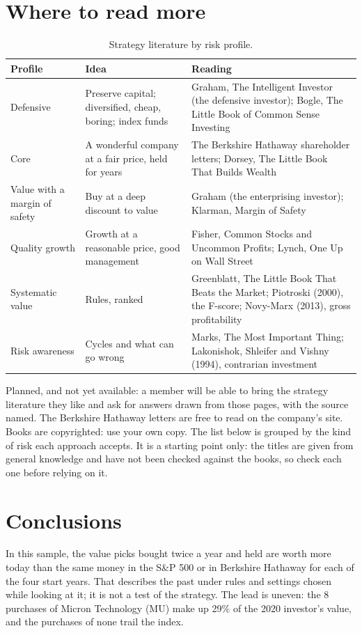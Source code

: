 \documentclass[11pt,a4paper]{article}
\begin{document}
\section{Where to read more}
\label{sec:reading}
\begin{table}[H]
\centering
\small
\caption{Strategy literature by risk profile.}\label{tab:reading}
\begin{tabular}{l p{4.5cm} p{5.6cm}}
\hline
Profile & Idea & Reading \\
\hline
Defensive & Preserve capital; diversified, cheap, boring; index funds & Graham, The Intelligent Investor (the defensive investor); Bogle, The Little Book of Common Sense Investing \\
Core & A wonderful company at a fair price, held for years & The Berkshire Hathaway shareholder letters; Dorsey, The Little Book That Builds Wealth \\
Value with a margin of safety & Buy at a deep discount to value & Graham (the enterprising investor); Klarman, Margin of Safety \\
Quality growth & Growth at a reasonable price, good management & Fisher, Common Stocks and Uncommon Profits; Lynch, One Up on Wall Street \\
Systematic value & Rules, ranked & Greenblatt, The Little Book That Beats the Market; Piotroski (2000), the F-score; Novy-Marx (2013), gross profitability \\
Risk awareness & Cycles and what can go wrong & Marks, The Most Important Thing; Lakonishok, Shleifer and Vishny (1994), contrarian investment \\
\hline
\end{tabular}
\end{table}
Planned, and not yet available: a member will be able to bring the strategy literature they like and ask for answers drawn from those pages, with the source named. The Berkshire Hathaway letters are free to read on the company's site. Books are copyrighted: use your own copy. The list below is grouped by the kind of risk each approach accepts. It is a starting point only: the titles are given from general knowledge and have not been checked against the books, so check each one before relying on it.

\section{Conclusions}
In this sample, the value picks bought twice a year and held are worth more today than the same money in the S\&P 500 or in Berkshire Hathaway for each of the four start years. That describes the past under rules and settings chosen while looking at it; it is not a test of the strategy. The lead is uneven: the 8 purchases of Micron Technology (MU) make up 29\% of the 2020 investor's value, and the purchases of none trail the index.
\end{document}
